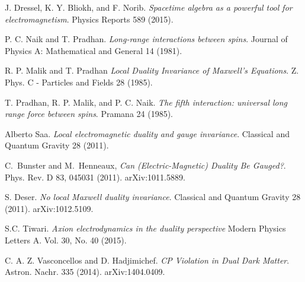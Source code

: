 \documentclass{article}
\begin{document}



  \begin{thebibliography}{9} 
      J. Dressel, K. Y. Bliokh, and F. Norib.
      \textit{Spacetime algebra as a powerful tool for electromagnetism}.
      Physics Reports 589 (2015).

      P. C. Naik and T. Pradhan.
      \textit{Long-range interactions between spins}.
      Journal of Physics A: Mathematical and General 14 (1981).

      R. P. Malik and T. Pradhan 
      \textit{Local Duality Invariance of Maxwell's Equations}.
      Z. Phys. C - Particles and Fields 28 (1985).

      T. Pradhan, R. P. Malik, and P. C. Naik.
      \textit{The fifth interaction: universal long range force between spins}.
      Pramana 24 (1985). 

      Alberto Saa.
      \textit{Local electromagnetic duality and gauge invariance}.
      Classical and Quantum Gravity 28 (2011).

      C.~Bunster and M.~Henneaux,
        \emph{Can (Electric-Magnetic) Duality Be Gauged?}.
        Phys. Rev. D 83, 045031 (2011).
        arXiv:1011.5889.

        S. Deser.
        \emph{No local Maxwell duality invariance}.
        Classical and Quantum Gravity
        28 (2011).
        arXiv:1012.5109.

      S.C. Tiwari.
      \emph{Axion electrodynamics in the duality perspective}
      Modern Physics Letters A.
      Vol. 30, No. 40 (2015).

      C. A. Z. Vasconcellos and D. Hadjimichef.
      \emph{CP Violation in Dual Dark Matter}.
      Astron. Nachr. 335 (2014).
      arXiv:1404.0409.

  \end{thebibliography}
\end{document}
